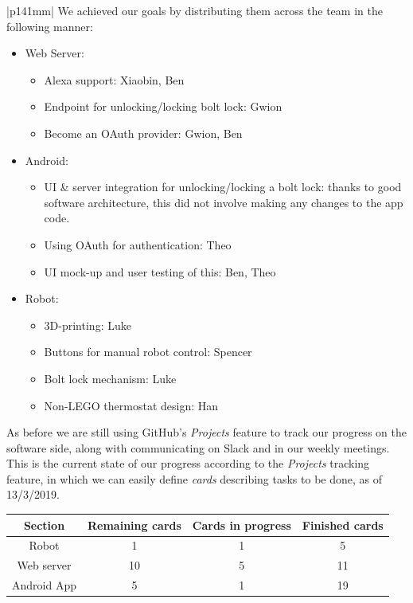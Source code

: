 \documentclass[a4paper]{article}
\newcommand{\colWidth}{141mm}
\begin{document}
\begin{center}
\begin{tabular}{|p{\colWidth}|}
		We achieved our goals by distributing them across the team in the following manner:
		\begin{itemize}
			\item Web Server:
				\begin{itemize}
					\item Alexa support: Xiaobin, Ben
					\item Endpoint for unlocking/locking bolt lock: Gwion
					\item Become an OAuth provider: Gwion, Ben
				\end{itemize}
			\item Android:
				\begin{itemize}
					\item UI \& server integration for unlocking/locking a bolt lock: thanks to good software architecture, this did not involve making any changes to the app code.
					\item Using OAuth for authentication: Theo
					\item UI mock-up and user testing of this: Ben, Theo
				\end{itemize}
			\item Robot:
			\begin{itemize}
				\item 3D-printing: Luke
				\item Buttons for manual robot control: Spencer
				\item Bolt lock mechanism: Luke
				\item Non-LEGO thermostat design: Han
			\end{itemize}
		\end{itemize}

		As before we are still using GitHub's \textit{Projects} feature to track our progress on the software side, along with communicating on Slack and in our weekly meetings.
		This is the current state of our progress according to the \textit{Projects} tracking feature, in which
		we can easily define \textit{cards} describing tasks to be done, as of 13/3/2019.
		
		\vspace{3mm}
		
		\begin{tabular}{| c || c | c | c |} \hline
			\textbf{Section} & \textbf{Remaining cards} & \textbf{Cards in progress} & \textbf{Finished cards}\\ \hline
			Robot & 1 & 1 & 5 \\
			Web server & 10 & 5 & 11 \\
			Android App & 5 & 1 & 19 \\ \hline
		\end{tabular}


\end{tabular}
\end{center}
\end{document}
